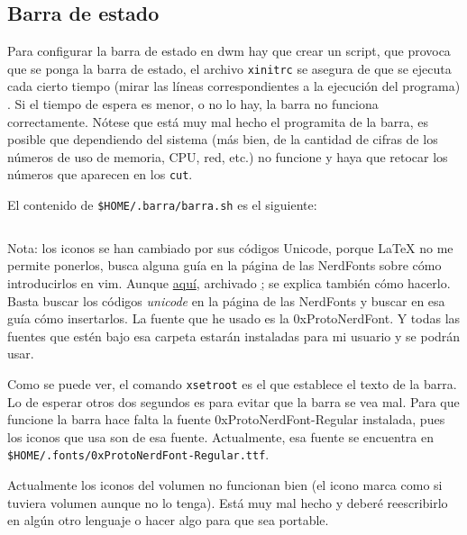 \documentclass{article}
\begin{document}
    \subsection{Barra de estado}
    Para configurar la barra de estado en dwm hay que crear un script, que provoca que se ponga la barra de estado,
    el archivo \texttt{xinitrc} se asegura de que se ejecuta cada cierto tiempo (mirar las líneas
    correspondientes a la ejecución del programa)
    . Si el tiempo de espera es menor, o no lo hay, la barra no funciona correctamente.
    Nótese que está muy mal hecho el programita de la barra, es posible que dependiendo
    del sistema (más bien, de la cantidad de cifras de los números de uso de memoria, CPU, red,
    etc.) no funcione y haya que retocar los números que aparecen en los \texttt{cut}.

    El contenido de \texttt{\$HOME/.barra/barra.sh} es el siguiente:

    \inputminted[breaklines, breakanywhere, breaksymbolleft="", breaksymbolright="", breakanywheresymbolpre="", breakanywheresymbolpost=""]
    {bash}{inc/barra.sh}

    Nota: los iconos se han cambiado por sus códigos Unicode, porque \LaTeX{} no
    me permite ponerlos, busca alguna guía en la página de las NerdFonts sobre
    cómo introducirlos en vim. Aunque \href{https://jdhao.github.io/2020/10/07/nvim_insert_unicode_char}
    {aquí}, archivado \href{https://web.archive.org/web/20250115064631/https://jdhao.github.io/2020/10/07/nvim_insert_unicode_char};
    se explica también cómo hacerlo. Basta buscar los códigos \textit{unicode}
    en la página de las NerdFonts y buscar en esa guía cómo insertarlos. La
    fuente que he usado es la 0xProtoNerdFont. Y todas las fuentes que estén
    bajo esa carpeta estarán instaladas para mi usuario y se podrán usar.

    Como se puede ver, el comando \texttt{xsetroot} es el que establece el texto de la barra.
    Lo de esperar otros dos segundos es para evitar  que la barra se vea mal.
    Para que funcione la barra hace falta la fuente 0xProtoNerdFont-Regular instalada,
    pues los iconos que usa son de esa fuente. Actualmente, esa fuente se encuentra en \texttt{\$HOME/.fonts/0xProtoNerdFont-Regular.ttf}.

    Actualmente los iconos del volumen no funcionan bien (el icono marca como si
    tuviera volumen aunque no lo tenga). Está muy mal hecho y deberé
    reescribirlo en algún otro lenguaje o hacer algo para que sea portable.
    
\end{document}
